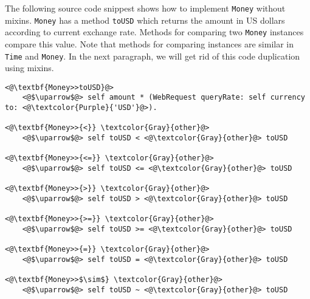 \documentclass[12pt]{article}
\begin{document}
The following source code snippest shows how to implement \texttt{Money} without mixins. \texttt{Money} has a method \texttt{toUSD} which returns the amount in US dollars according to current exchange rate. Methods for comparing two \texttt{Money} instances compare this value. Note that methods for comparing instances are similar in \texttt{Time} and \texttt{Money}. In the next paragraph, we will get rid of this code duplication using mixins.
\begin{lstlisting}
<@\textbf{Money>>toUSD}@>
    <@$\uparrow$@> self amount * (WebRequest queryRate: self currency to: <@\textcolor{Purple}{'USD'}@>).

<@\textbf{Money>>{<}} \textcolor{Gray}{other}@>
    <@$\uparrow$@> self toUSD < <@\textcolor{Gray}{other}@> toUSD

<@\textbf{Money>>{<=}} \textcolor{Gray}{other}@>
    <@$\uparrow$@> self toUSD <= <@\textcolor{Gray}{other}@> toUSD
    
<@\textbf{Money>>{>}} \textcolor{Gray}{other}@>
    <@$\uparrow$@> self toUSD > <@\textcolor{Gray}{other}@> toUSD
    
<@\textbf{Money>>{>=}} \textcolor{Gray}{other}@>
    <@$\uparrow$@> self toUSD >= <@\textcolor{Gray}{other}@> toUSD
    
<@\textbf{Money>>{=}} \textcolor{Gray}{other}@>
    <@$\uparrow$@> self toUSD = <@\textcolor{Gray}{other}@> toUSD
    
<@\textbf{Money>>$\sim$} \textcolor{Gray}{other}@>
    <@$\uparrow$@> self toUSD ~ <@\textcolor{Gray}{other}@> toUSD
\end{lstlisting}
\end{document}
